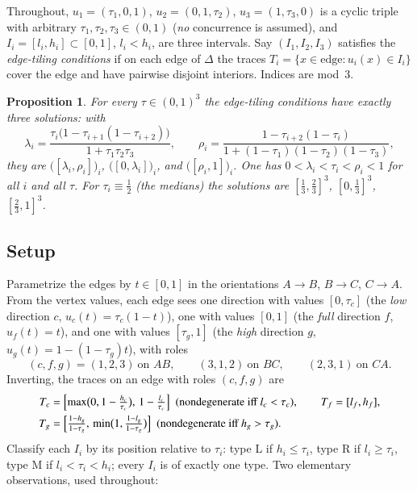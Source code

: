 \documentclass{aims}
\numberwithin{equation}{section}
\theoremstyle{plain}
\newtheorem{proposition}[theorem]{Proposition}
\theoremstyle{definition}
\theoremstyle{remark}
\begin{document}
Throughout, $u_1=(\tau_1,0,1)$, $u_2=(0,1,\tau_2)$, $u_3=(1,\tau_3,0)$ is a
cyclic triple with arbitrary $\tau_1,\tau_2,\tau_3\in(0,1)$ (\emph{no}
concurrence is assumed), and $I_i=[l_i,h_i]\subset[0,1]$, $l_i<h_i$, are three
intervals. Say $(I_1,I_2,I_3)$ satisfies the \emph{edge-tiling conditions} if on
each edge of $\Delta$ the traces $T_i=\{x\in\text{edge}: u_i(x)\in I_i\}$ cover
the edge and have pairwise disjoint interiors. Indices are mod~$3$.

\begin{proposition}\label{prop:tilings}
For every $\tau\in(0,1)^3$ the edge-tiling conditions have exactly three
solutions: with
\[
\lambda_i=\frac{\tau_i\bigl(1-\tau_{i+1}(1-\tau_{i+2})\bigr)}{1+\tau_1\tau_2\tau_3},
\qquad
\rho_i=\frac{1-\tau_{i+2}(1-\tau_i)}{1+(1-\tau_1)(1-\tau_2)(1-\tau_3)},
\]
they are $\bigl([\lambda_i,\rho_i]\bigr)_i$, $\bigl([0,\lambda_i]\bigr)_i$, and
$\bigl([\rho_i,1]\bigr)_i$. One has $0<\lambda_i<\tau_i<\rho_i<1$ for all $i$ and
all $\tau$. For $\tau_i\equiv\tfrac12$ (the medians) the solutions are
$[\tfrac13,\tfrac23]^3$, $[0,\tfrac13]^3$, $[\tfrac23,1]^3$.
\end{proposition}

\subsection*{Setup}
Parametrize the edges by $t\in[0,1]$ in the orientations $A\!\to\!B$,
$B\!\to\!C$, $C\!\to\!A$. From the vertex values, each edge sees one direction
with values $[0,\tau_c]$ (the \emph{low} direction $c$, $u_c(t)=\tau_c(1-t)$),
one with values $[0,1]$ (the \emph{full} direction $f$, $u_f(t)=t$), and one
with values $[\tau_g,1]$ (the \emph{high} direction $g$,
$u_g(t)=1-(1-\tau_g)t$), with roles
\[
(c,f,g)=(1,2,3)\ \text{on } AB,\qquad (3,1,2)\ \text{on } BC,\qquad
(2,3,1)\ \text{on } CA .
\]
Inverting, the traces on an edge with roles $(c,f,g)$ are
\begin{equation}\label{eq:traces}
\begin{aligned}
T_c&=\Bigl[\max\bigl(0,1-\tfrac{h_c}{\tau_c}\bigr),\,1-\tfrac{l_c}{\tau_c}\Bigr]
\ \ (\text{nondegenerate iff }l_c<\tau_c),\qquad T_f=[l_f,h_f],\\
T_g&=\Bigl[\tfrac{1-h_g}{1-\tau_g},\,
\min\bigl(1,\tfrac{1-l_g}{1-\tau_g}\bigr)\Bigr]
\ \ (\text{nondegenerate iff }h_g>\tau_g).
\end{aligned}
\end{equation}
Classify each $I_i$ by its position relative to $\tau_i$: type $\mathrm L$ if
$h_i\le\tau_i$, type $\mathrm R$ if $l_i\ge\tau_i$, type $\mathrm M$ if
$l_i<\tau_i<h_i$; every $I_i$ is of exactly one type. Two elementary
observations, used throughout:
\end{document}
